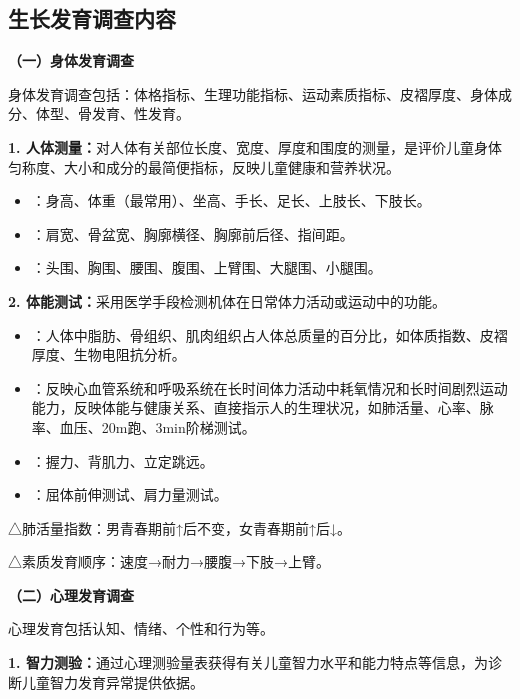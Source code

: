 \subsection{生长发育调查内容}

\begin{defbox}
\textbf{（一）身体发育调查}

身体发育调查包括：体格指标、生理功能指标、运动素质指标、皮褶厚度、身体成分、体型、骨发育、性发育。

\textbf{1. 人体测量：}对人体有关部位长度、宽度、厚度和围度的测量，是评价儿童身体匀称度、大小和成分的最简便指标，反映儿童健康和营养状况。

\begin{itemize}[leftmargin=*]
    \item {}：身高、体重（最常用）、坐高、手长、足长、上肢长、下肢长。
    \item {}：肩宽、骨盆宽、胸廓横径、胸廓前后径、指间距。
    \item {}：头围、胸围、腰围、腹围、上臂围、大腿围、小腿围。
\end{itemize}

\textbf{2. 体能测试：}采用医学手段检测机体在日常体力活动或运动中的功能。

\begin{itemize}[leftmargin=*]
    \item {}：人体中脂肪、骨组织、肌肉组织占人体总质量的百分比，如体质指数、皮褶厚度、生物电阻抗分析。
    \item {}：反映心血管系统和呼吸系统在长时间体力活动中耗氧情况和长时间剧烈运动能力，反映体能与健康关系、直接指示人的生理状况，如肺活量、心率、脉率、血压、20m跑、3min阶梯测试。
    \item {}：握力、背肌力、立定跳远。
    \item {}：屈体前伸测试、肩力量测试。
\end{itemize}

△肺活量指数：男青春期前↑后不变，女青春期前↑后↓。

△素质发育顺序：速度→耐力→腰腹→下肢→上臂。

\textbf{（二）心理发育调查}

心理发育包括认知、情绪、个性和行为等。

\textbf{1. 智力测验：}通过心理测验量表获得有关儿童智力水平和能力特点等信息，为诊断儿童智力发育异常提供依据。


\end{defbox}
